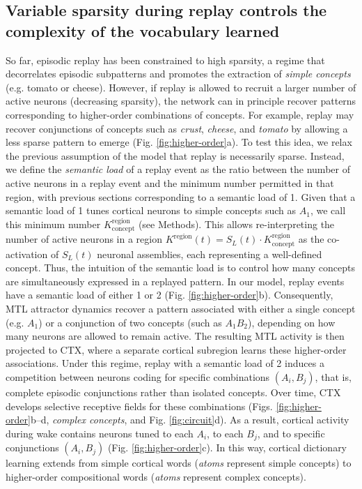 \documentclass{article}
\begin{document}
\subsection*{Variable sparsity during replay controls the complexity of the vocabulary learned}
So far, episodic replay has been constrained to high sparsity, a regime that decorrelates episodic subpatterns and promotes the extraction of \textit{simple concepts} (e.g. tomato or cheese). However, if replay is allowed to recruit a larger number of active neurons (decreasing sparsity), the network can in principle recover patterns corresponding to higher-order combinations of concepts. For example, replay may recover conjunctions of concepts such as \textit{crust}, \textit{cheese}, and \textit{tomato} by allowing a less sparse pattern to emerge (Fig. \ref{fig:higher-order}a).
\newline\newline
To test this idea, we relax the previous assumption of the model that replay is necessarily sparse. Instead, we define the \textit{semantic load} of a replay event as the ratio between the number of active neurons in a replay event and the minimum number permitted in that region, with previous sections corresponding to a semantic load of 1. Given that a semantic load of 1 tunes cortical neurons to simple concepts such as $A_1$, we call this minimum number $K^\textrm{region}_\textrm{concept}$ (see Methods). This allows re-interpreting the number of active neurons in a region $K^\textrm{region}(t) = S_L(t)\cdot K^\textrm{region}_\textrm{concept}$ as the co-activation of $S_L(t)$ neuronal assemblies, each representing a well-defined concept. Thus, the intuition of the semantic load is to control how many concepts are simultaneously expressed in a replayed pattern. In our model, replay events have a semantic load of either 1 or 2 (Fig. \ref{fig:higher-order}b). Consequently, MTL attractor dynamics recover a pattern associated with either a single concept (e.g. $A_1$) or a conjunction of two concepts (such as $A_1B_2$), depending on how many neurons are allowed to remain active. The resulting MTL activity is then projected to CTX, where a separate cortical subregion learns these higher-order associations.
\newline\newline
Under this regime, replay with a semantic load of 2 induces a competition between neurons coding for specific combinations $(A_i,B_j)$, that is, complete episodic conjunctions rather than isolated concepts. Over time, CTX develops selective receptive fields for these combinations (Figs. \ref{fig:higher-order}b--d, \textit{complex concepts}, and Fig. \ref{fig:circuit}d). As a result, cortical activity during wake contains neurons tuned to each $A_i$, to each $B_j$, and to specific conjunctions $(A_i,B_j)$ (Fig. \ref{fig:higher-order}c). In this way, cortical dictionary learning extends from simple cortical words (\textit{atoms} represent simple concepts) to higher-order compositional words (\textit{atoms} represent complex concepts).
\end{document}
